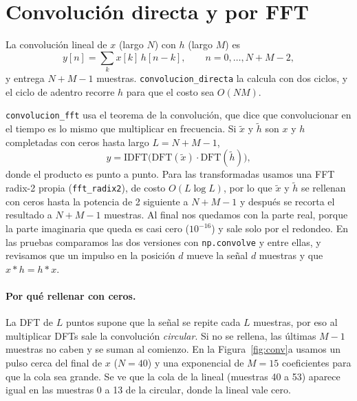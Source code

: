 %

\section{Convolución directa y por FFT}
\label{sec:convolucion}

La convolución lineal de $x$ (largo $N$) con $h$ (largo $M$) es
\begin{equation}
  y[n] = \sum_{k} x[k]\, h[n-k], \qquad n = 0, \dots, N+M-2,
  \label{eq:conv}
\end{equation}
y entrega $N+M-1$ muestras. \texttt{convolucion\_directa} la calcula con dos ciclos, y el ciclo de
adentro recorre $h$ para que el costo sea $O(NM)$.

\texttt{convolucion\_fft} usa el teorema de la convolución, que dice que convolucionar en el tiempo
es lo mismo que multiplicar en frecuencia. Si $\tilde{x}$ y $\tilde{h}$ son $x$ y $h$ completadas
con ceros hasta largo $L = N+M-1$,
\begin{equation}
  y = \mathrm{IDFT}\big(\mathrm{DFT}(\tilde{x}) \cdot \mathrm{DFT}(\tilde{h})\big),
  \label{eq:teorema-conv}
\end{equation}
donde el producto es punto a punto. Para las transformadas usamos una FFT radix-2 propia
(\texttt{fft\_radix2}), de costo $O(L\log L)$, por lo que $\tilde{x}$ y $\tilde{h}$ se rellenan
con ceros hasta la potencia de 2 siguiente a $N+M-1$ y después se recorta el resultado a $N+M-1$
muestras. Al final nos quedamos con la parte real, porque la parte imaginaria que
queda es casi cero ($10^{-16}$) y sale solo por el redondeo. En las pruebas comparamos las dos
versiones con \texttt{np.convolve} y entre ellas, y revisamos que un impulso en la posición $d$
mueve la señal $d$ muestras y que $x*h = h*x$.

\paragraph{Por qué rellenar con ceros.} La DFT de $L$ puntos supone que la señal se repite cada $L$
muestras, por eso al multiplicar DFTs sale la convolución \emph{circular}. Si no se rellena, las
últimas $M-1$ muestras no caben y se suman al comienzo. En la Figura~\ref{fig:conv}a usamos un
pulso cerca del final de $x$ ($N=40$) y una exponencial de $M=15$ coeficientes para que la cola
sea grande. Se ve que la cola de la lineal (muestras 40 a 53) aparece igual en las muestras 0 a 13
de la circular, donde la lineal vale cero.

